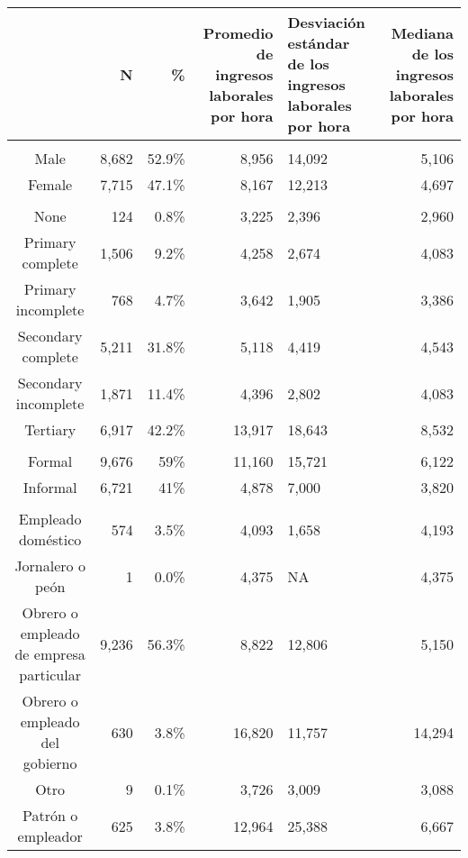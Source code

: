 \begin{table}[t]
\fontsize{12.0pt}{14.4pt}\selectfont
\begin{tabular*}{\linewidth}{@{\extracolsep{\fill}}crrrlr}
\toprule
  & N & \% & Promedio de ingresos laborales por hora & Desviación estándar de los ingresos laborales por hora & Mediana de los ingresos laborales por hora \\ 
\midrule\addlinespace[2.5pt]
\multicolumn{6}{l}{{\bfseries Sexo}} \\[2.5pt] 
\midrule\addlinespace[2.5pt]
Male & 8,682 & 52.9\% & 8,956 & 14,092 & 5,106 \\ 
Female & 7,715 & 47.1\% & 8,167 & 12,213 & 4,697 \\ 
\midrule\addlinespace[2.5pt]
\multicolumn{6}{l}{{\bfseries Máximo nivel educativo}} \\[2.5pt] 
\midrule\addlinespace[2.5pt]
None &   124 &  0.8\% &  3,225 &  2,396 & 2,960 \\ 
Primary complete & 1,506 &  9.2\% &  4,258 &  2,674 & 4,083 \\ 
Primary incomplete &   768 &  4.7\% &  3,642 &  1,905 & 3,386 \\ 
Secondary complete & 5,211 & 31.8\% &  5,118 &  4,419 & 4,543 \\ 
Secondary incomplete & 1,871 & 11.4\% &  4,396 &  2,802 & 4,083 \\ 
Tertiary & 6,917 & 42.2\% & 13,917 & 18,643 & 8,532 \\ 
\midrule\addlinespace[2.5pt]
\multicolumn{6}{l}{{\bfseries Formalidad}} \\[2.5pt] 
\midrule\addlinespace[2.5pt]
Formal & 9,676 & 59\% & 11,160 & 15,721 & 6,122 \\ 
Informal & 6,721 & 41\% &  4,878 &  7,000 & 3,820 \\ 
\midrule\addlinespace[2.5pt]
\multicolumn{6}{l}{{\bfseries Posición Ocupacional}} \\[2.5pt] 
\midrule\addlinespace[2.5pt]
Empleado doméstico &   574 &  3.5\% &  4,093 &  1,658 &  4,193 \\ 
Jornalero o peón &     1 &  0.0\% &  4,375 &     NA &  4,375 \\ 
Obrero o empleado de empresa particular & 9,236 & 56.3\% &  8,822 & 12,806 &  5,150 \\ 
Obrero o empleado del gobierno &   630 &  3.8\% & 16,820 & 11,757 & 14,294 \\ 
Otro &     9 &  0.1\% &  3,726 &  3,009 &  3,088 \\ 
Patrón o empleador &   625 &  3.8\% & 12,964 & 25,388 &  6,667 \\ 

\end{tabular*}
\end{table}
